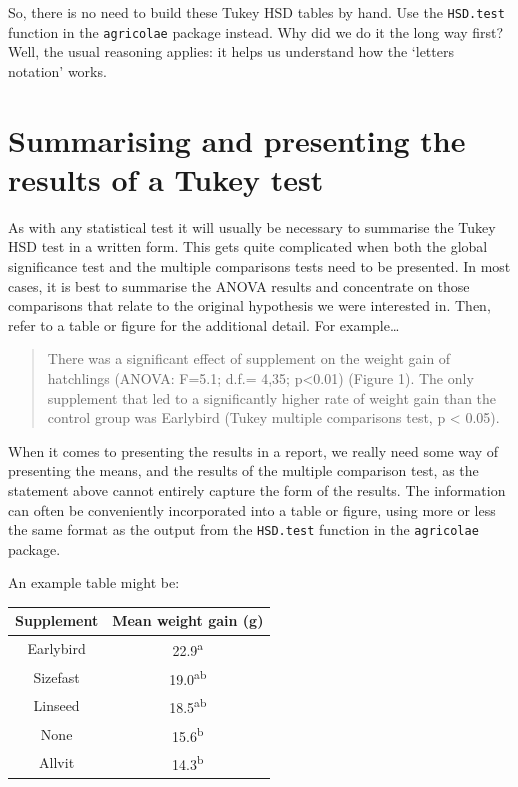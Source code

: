 \documentclass[
]{book}
\begin{document}
So, there is no need to build these Tukey HSD tables by hand. Use the \texttt{HSD.test} function in the \texttt{agricolae} package instead. Why did we do it the long way first? Well, the usual reasoning applies: it helps us understand how the `letters notation' works.

\hypertarget{summarise}{%
\section{Summarising and presenting the results of a Tukey test}\label{summarise}}

As with any statistical test it will usually be necessary to summarise the Tukey HSD test in a written form. This gets quite complicated when both the global significance test and the multiple comparisons tests need to be presented. In most cases, it is best to summarise the ANOVA results and concentrate on those comparisons that relate to the original hypothesis we were interested in. Then, refer to a table or figure for the additional detail. For example\ldots{}

\begin{quote}
There was a significant effect of supplement on the weight gain of hatchlings (ANOVA: F=5.1; d.f.= 4,35; p\textless0.01) (Figure 1). The only supplement that led to a significantly higher rate of weight gain than the control group was Earlybird (Tukey multiple comparisons test, p \textless{} 0.05).
\end{quote}

When it comes to presenting the results in a report, we really need some way of presenting the means, and the results of the multiple comparison test, as the statement above cannot entirely capture the form of the results. The information can often be conveniently incorporated into a table or figure, using more or less the same format as the output from the \texttt{HSD.test} function in the \texttt{agricolae} package.

An example table might be:

\begin{longtable}[]{@{}cc@{}}
\toprule
\textbf{Supplement} & Mean weight gain (g) \\
\midrule
\endhead
Earlybird & 22.9\textsuperscript{a} \\
Sizefast & 19.0\textsuperscript{ab} \\
Linseed & 18.5\textsuperscript{ab} \\
None & 15.6\textsuperscript{b} \\
Allvit & 14.3\textsuperscript{b} \\
\bottomrule
\end{longtable}
\end{document}
